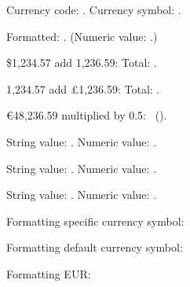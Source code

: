 \documentclass[12pt]{article}
\begin{document}
Currency code: \DTLCurrencyCode. Currency symbol: \DTLCurrencySymbol. 

Formatted: \formattedresult.
(Numeric value: \DTLdatumvalue{\formattedresult}.) 

\$1,234.57 add 1,236.59:
Total: \total. 

1,234.57 add £1,236.59:
Total: \total. 

€48,236.59 multiplied by 0.5:
\result\ (\DTLdatumvalue{\result}). 

\DTLparse{}
String value: \parsed.
Numeric value: \DTLdatumvalue{\parsed}.


\DTLparse{}
String value: \parsed.
Numeric value: \DTLdatumvalue{\parsed}.


\DTLparse{}
String value: \parsed.
Numeric value: \DTLdatumvalue{\parsed}. 

Formatting specific currency symbol:  

Formatting default currency symbol:  

Formatting EUR:  
\end{document}
